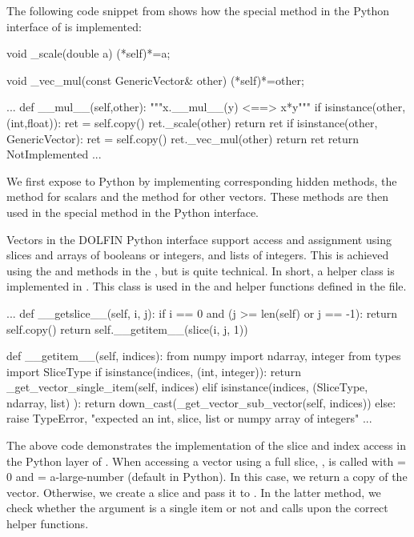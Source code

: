 The following code snippet from  shows how the special
method  in the Python interface of 
is implemented:
\begin{swigcode}
  void _scale(double a)
  {(*self)*=a;}

  void _vec_mul(const GenericVector& other)
  {(*self)*=other;}

   ...
    def __mul__(self,other):
        """x.__mul__(y) <==> x*y"""
        if isinstance(other,(int,float)):
            ret = self.copy()
            ret._scale(other)
            return ret
        if isinstance(other, GenericVector):
            ret = self.copy()
            ret._vec_mul(other)
            return ret
        return NotImplemented
    ...
\end{swigcode}
We first expose  to Python by implementing
corresponding hidden methods, the  method for scalars and
the  method for other vectors. These methods are then
used in the  special method in the Python interface.

Vectors in the DOLFIN Python interface support access and assignment using slices and
\numpy arrays of booleans or integers, and lists of integers. This
is achieved using the  and  methods in the
, but is quite technical. In short, a helper class
 is implemented in . This class is used in
the  and  helper functions defined
in the  file.
\begin{python}
   ...
    def __getslice__(self, i, j):
        if i == 0 and (j >= len(self) or j == -1):
            return self.copy()
        return self.__getitem__(slice(i, j, 1))

    def __getitem__(self, indices):
        from numpy import ndarray, integer
        from types import SliceType
        if isinstance(indices, (int, integer)):
            return _get_vector_single_item(self, indices)
        elif isinstance(indices, (SliceType, ndarray, list) ):
            return down_cast(_get_vector_sub_vector(self, indices))
        else:
            raise TypeError, "expected an int, slice, list or numpy array of integers"
  ...
\end{python}
The above code demonstrates the implementation of the slice and index
access in the Python layer of . When accessing a
vector using a full slice, ,  is called
with  = 0 and  = a-large-number (default in Python).
In this case, we return a copy of the vector. Otherwise, we create a
slice and pass it to . In the latter method, we
check whether the  argument is a single item or not and
calls upon the correct helper functions.

